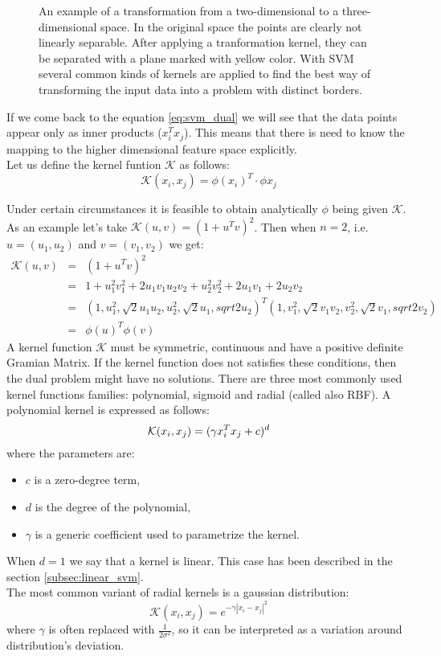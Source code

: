 \begin{figure}[htbp]
  \centering
  
  \caption{An example of a transformation from a two-dimensional to a three-dimensional space. In the original space the points are clearly not linearly separable. After applying a tranformation kernel, they can be separated with a plane marked with yellow color. With SVM several common kinds of kernels are applied to find the best way of transforming the input data into a problem with distinct borders. }
  \label{fig:2dto3d}
\end{figure}

If we come back to the equation \ref{eq:svm_dual} we will see that the data points appear only as inner products ($x_i^Tx_j$). This means that there is need to know the mapping to the higher dimensional feature space explicitly. \\
Let us define the kernel funtion $\mathcal{K}$ as follows:
\begin{equation}
\mathcal{K}(x_i, x_j) = \phi(x_i)^T \cdot \phi{x_j}
\end{equation}

Under certain circumstances it is feasible to obtain analytically $\phi$ being given $\mathcal{K}$. As an example let's take $\mathcal{K}(u, v) = (1+u^Tv)^2$. Then when $n=2$, i.e. $u=(u_1,u_2)$ and $v=(v_1, v_2)$ we get:
\begin{align*}
\mathcal{K}(u, v) & = & (1+u^Tv)^2 \\
& = & 1 + u_1^2v_1^2+2u_1v_1u_2v_2+u_2^2v_2^2+2u_1v_1+2u_2v_2 \\
& = & (1, u_1^2, \sqrt{2}u_1u_2, u_2^2, \sqrt{2}u_1, sqrt{2}u_2)^T(1, v_1^2, \sqrt{2}v_1v_2, v_2^2, \sqrt{2}v_1, sqrt{2}v_2) \\
& = & \phi(u)^T\phi(v)
\end{align*}
A kernel function $\mathcal{K}$ must be symmetric, continuous and have a positive definite Gramian Matrix. If the kernel function does not satisfies these conditions, then the dual problem might have no solutions.
There are three most commonly used kernel functions families: polynomial, sigmoid and radial (called also RBF).
A polynomial kernel is expressed as follows:
\begin{equation}
\mathcal{K}(x_i, x_j) = (\gamma x_i^Tx_j + c)^d \\
\end{equation}
where the parameters are:
\begin{itemize}
\item $c$ is a zero-degree term,
\item $d$ is the degree of the polynomial,
\item $\gamma$ is a generic coefficient used to parametrize the kernel.
\end{itemize}
When $d=1$ we say that a kernel is linear. This case has been described in the section \ref{subsec:linear_svm}.
\\
The most common variant of radial kernels is a gaussian distribution:
\begin{equation}
\mathcal{K}(x_i, x_j) = e^{-\gamma|x_i-x_j|^2}
\end{equation}
where $\gamma$ is often replaced with $\frac{1}{2\sigma^2}$, so it can be interpreted as a variation around distribution's deviation.
